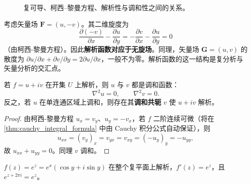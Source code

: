 \begin{figure}[htbp]
\centering
{}
\caption{复可导、柯西--黎曼方程、解析性与调和性之间的关系。}
\label{fig:cr_analytic_harmonic}
\end{figure}

\begin{remark}[柯西-黎曼方程与旋度为零]\label{rem:cr_curl_zero}
考虑矢量场 $\mathbf{F} = (u, -v)$。其二维旋度为
\[
\frac{\partial(-v)}{\partial x} - \frac{\partial u}{\partial y} = -\frac{\partial v}{\partial x} - \frac{\partial u}{\partial y} = 0
\]
（由柯西-黎曼方程）。因此\textbf{解析函数对应于无旋场}。同理，矢量场 $\mathbf{G} = (u, v)$ 的散度为 $\partial u/\partial x + \partial v/\partial y = 2\partial u/\partial x$，一般不为零。解析函数的这一结构是复分析与矢量分析的交汇点。
\end{remark}

\begin{corollary}[解析函数的实部与虚部都是调和函数]\label{cor:harmonic_parts}
若 $f = u + iv$ 在开集 $U$ 上解析，则 $u$ 与 $v$ 都是调和函数：
\[
\nabla^2 u = 0, \qquad \nabla^2 v = 0.
\]
反之，若 $u$ 在单连通区域上调和，则存在其\textbf{调和共轭} $v$ 使 $u + iv$ 解析。
\end{corollary}

\begin{proof}
由柯西-黎曼方程 $u_x = v_y$、$u_y = -v_x$，若 $f$ 二阶连续可微（将在 \cref{thm:cauchy_integral_formula} 中由 Cauchy 积分公式自动保证），则
\[
u_{xx} = (v_y)_x = v_{yx} = v_{xy} = (-u_y)_y = -u_{yy},
\]
故 $u_{xx} + u_{yy} = 0$。同理 $v$ 调和。
\end{proof}

\begin{proposition}[复指数函数的周期性与导数]\label{prop:complex_exp_periodicity}
$f(z) = e^z = e^x(\cos y + i\sin y)$ 在整个复平面上解析，$f'(z) = e^z$，且 $e^{z + 2\pi i} = e^z$。
\end{proposition}

